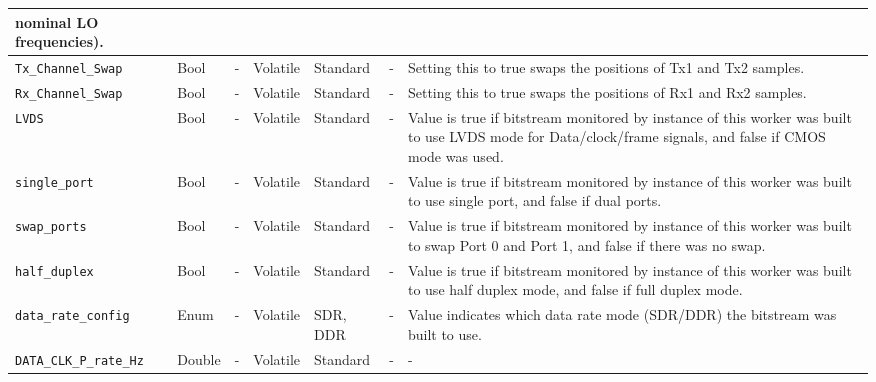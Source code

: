 \documentclass{article}
\begin{document}
\begin{landscape}
\begin{scriptsize}
\begin{longtable}{|p{3.6cm}|p{8.1cm}|p{1.4cm}|p{1.3cm}|p{1.4cm}|p{2.5cm}|p{3.6cm}|}
                                    nominal LO frequencies). \\
			\hline
			\verb+Tx_Channel_Swap+ & Bool & - & Volatile & Standard & - & Setting this to true swaps the positions of Tx1 and Tx2 samples. \\
			\hline
			\verb+Rx_Channel_Swap+ & Bool & - & Volatile & Standard & - & Setting this to true swaps the positions of Rx1 and Rx2 samples. \\
			\hline
			\verb+LVDS+ & Bool & - & Volatile & Standard & - & Value is true if bitstream monitored by instance of this worker was built to use LVDS mode for Data/clock/frame signals, and false if CMOS mode was used. \\
			\hline
			\verb+single_port+ & Bool & - & Volatile & Standard & - & Value is true if bitstream monitored by instance of this worker was built to use single port, and false if dual ports. \\
			\hline
			\verb+swap_ports+ & Bool & - & Volatile & Standard & - & Value is true if bitstream monitored by instance of this worker was built to swap Port 0 and Port 1, and false if there was no swap. \\
			\hline
			\verb+half_duplex+ & Bool & - & Volatile & Standard & - & Value is true if bitstream monitored by instance of this worker was built to use half duplex mode, and false if full duplex mode. \\
			\hline
			\verb+data_rate_config+ & Enum & - & Volatile & SDR, DDR & - & Value indicates which data rate mode (SDR/DDR) the bitstream was built to use. \\
			\hline
			\verb+DATA_CLK_P_rate_Hz+ & Double & - & Volatile & Standard & - & - \\
			\hline
		\end{longtable}
	\end{scriptsize}

\pagebreak


\end{landscape}
\end{document}
